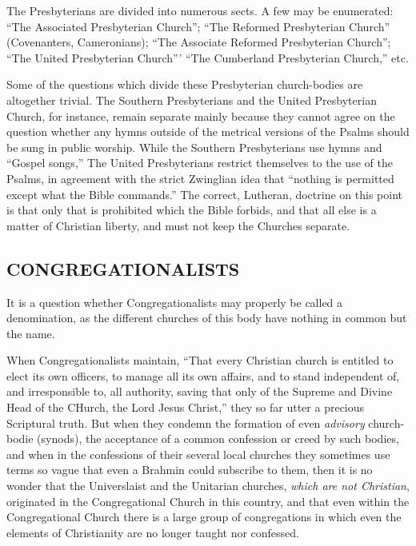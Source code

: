 \documentclass[
]{book}
\begin{document}
The Presbyterians are divided into numerous sects. A few may be enumerated: ``The Associated Presbyterian Church''; ``The Reformed Presbyterian Church'' (Covenanters, Cameronians); ``The Associate Reformed Presbyterian Church''; ``The United Presbyterian Church''' ``The Cumberland Presbyterian Church,'' etc.

Some of the questions which divide these Presbyterian church-bodies are altogether trivial. The Southern Presbyterians and the United Presbyterian Church, for instance, remain separate mainly because they cannot agree on the question whether any hymns outside of the metrical versions of the Psalms should be sung in public worship. While the Southern Presbyterians use hymns and ``Gospel songs,'' The United Presbyterians restrict themselves to the use of the Psalms, in agreement with the strict Zwinglian idea that ``nothing is permitted except what the Bible commands.'' The correct, Lutheran, doctrine on this point is that only that is prohibited which the Bible forbids, and that all else is a matter of Christian liberty, and must not keep the Churches separate.

\hypertarget{congregationalists}{%
\subsection{CONGREGATIONALISTS}\label{congregationalists}}

It is a question whether Congregationalists may properly be called a denomination, as the different churches of this body have nothing in common but the name.

When Congregationalists maintain, ``That every Christian church is entitled to elect its own officers, to manage all its own affairs, and to stand independent of, and irresponsible to, all authority, saving that only of the Supreme and Divine Head of the CHurch, the Lord Jesus Christ,'' they so far utter a precious Scriptural truth. But when they condemn the formation of even \emph{advisory} church-bodie (synods), the acceptance of a common confession or creed by such bodies, and when in the confessions of their several local churches they sometimes use terms so vague that even a Brahmin could subscribe to them, then it is no wonder that the Universlaist and the Unitarian churches, \emph{which are not Christian}, originated in the Congregational Church in this country, and that even within the Congregational Church there is a large group of congregations in which even the elements of Christianity are no longer taught nor confessed.
\end{document}
